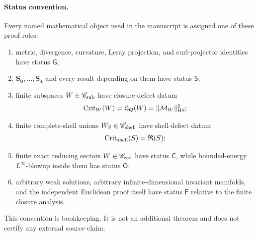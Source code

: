 \documentclass[aps,prd,reprint,superscriptaddress,nofootinbib,floatfix]{revtex4-2}
\theoremstyle{definition}
\theoremstyle{remark}
\newcommand{\cM}{\mathcal{M}}
\begin{document}
\paragraph*{Status convention.}
Every named mathematical object used in the manuscript is assigned one of these proof roles:
\begin{enumerate}[label=(\roman*),leftmargin=*]
    \item metric, divergence, curvature, Leray projection, and curl-projector identities have status \(\mathsf G\);
    \item \(\mathbf{S_0},\ldots,\mathbf{S_4}\) and every result depending on them have status \(\mathsf S\);
    \item finite subspaces \(W\in\mathscr C_{\rm sub}\) have closure-defect datum
          \[
              \operatorname{Crit}_W(W)=\mathfrak L_Q(W)=\|\cM_W\|_{\rm HS}^2;
          \]
    \item finite complete-shell unions \(W_S\in\mathscr C_{\rm shell}\) have shell-defect datum
          \[
              \operatorname{Crit}_{\rm shell}(S)=\mathfrak R(S);
          \]
    \item finite exact reducing sectors \(W\in\mathscr C_{\rm red}\) have status \(\mathsf C\), while bounded-energy \(L^\infty\)-blowup inside them has status \(\mathsf O\);
    \item arbitrary weak solutions, arbitrary infinite-dimensional invariant manifolds, and the independent Euclidean proof itself have status \(\mathsf F\) relative to the finite closure analysis.
\end{enumerate}
This convention is bookkeeping. It is not an additional theorem and does not certify any external source claim.
\end{document}
